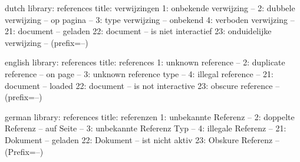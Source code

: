 %

%
%

%
%



\unprotect

\startmessages  dutch  library: references
  title: verwijzingen
      1: onbekende verwijzing --
      2: dubbele verwijzing -- op pagina --
      3: type verwijzing -- onbekend
      4: verboden verwijzing --
     21: document -- geladen
     22: document -- is niet interactief
     23: onduidelijke verwijzing -- (prefix=--)
\stopmessages

\startmessages  english  library: references
  title: references
      1: unknown reference --
      2: duplicate reference -- on page --
      3: unknown reference type --
      4: illegal reference --
     21: document -- loaded
     22: document -- is not interactive
     23: obscure reference -- (prefix=--)
\stopmessages

\startmessages  german  library: references
  title: referenzen
      1: unbekannte Referenz --
      2: doppelte Referenz -- auf Seite --
      3: unbekannte Referenz Typ --
      4: illegale Referenz --
     21: Dokument -- geladen
     22: Dokument -- ist nicht aktiv
     23: Obskure Referenz -- (Prefix=--)
\stopmessages

